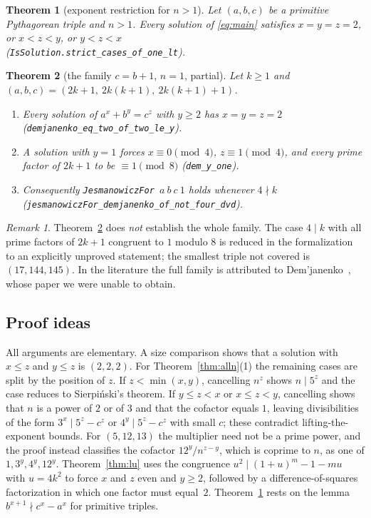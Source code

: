 \documentclass[11pt,a4paper]{article}
\newtheorem{theorem}{Theorem}
\theoremstyle{remark}
\newtheorem{remark}{Remark}
\newcommand{\lean}[1]{\texttt{#1}}
\begin{document}
\begin{theorem}[exponent restriction for $n>1$]\label{thm:red}
Let $(a,b,c)$ be a primitive Pythagorean triple and $n>1$. Every solution of
\eqref{eq:main} satisfies $x=y=z=2$, or $x<z<y$, or $y<z<x$
\\ \textup{(\lean{IsSolution.strict\_cases\_of\_one\_lt})}.
\end{theorem}

\begin{theorem}[the family $c=b+1$, $n=1$, partial]\label{thm:dem}
Let $k\ge 1$ and $(a,b,c)=(2k+1,\ 2k(k+1),\ 2k(k+1)+1)$.
\begin{enumerate}
\item Every solution of $a^x+b^y=c^z$ with $y\ge 2$ has $x=y=z=2$
\\ \textup{(\lean{demjanenko\_eq\_two\_of\_two\_le\_y})}.
\item A solution with $y=1$ forces $x\equiv 0 \pmod 4$, $z\equiv 1\pmod 4$, and
every prime factor of $2k+1$ to be $\equiv 1 \pmod 8$ \textup{(\lean{dem\_y\_one})}.
\item Consequently \lean{JesmanowiczFor}~$a\ b\ c\ 1$ holds whenever $4\nmid k$
\\ \textup{(\lean{jesmanowiczFor\_demjanenko\_of\_not\_four\_dvd})}.
\end{enumerate}
\end{theorem}

\begin{remark}
Theorem~\ref{thm:dem} does \emph{not} establish the whole family. The case
$4\mid k$ with all prime factors of $2k+1$ congruent to $1$ modulo $8$ is
reduced in the formalization to an explicitly unproved statement; the smallest
triple not covered is $(17,144,145)$. In the literature the full family is
attributed to Dem'janenko~\cite{Dem}, whose paper we were unable to obtain.
\end{remark}

\subsection*{Proof ideas}

All arguments are elementary. A size comparison shows that a solution with
$x\le z$ and $y\le z$ is $(2,2,2)$. For Theorem~\ref{thm:alln}(1) the remaining
cases are split by the position of $z$. If $z<\min(x,y)$, cancelling $n^z$
shows $n\mid 5^z$ and the case reduces to Sierpi\'nski's theorem. If
$y\le z<x$ or $x\le z<y$, cancelling shows that $n$ is a power of $2$ or of
$3$ and that the cofactor equals $1$, leaving divisibilities of the form
$3^x\mid 5^z-c^z$ or $4^y\mid 5^z-c^z$ with small $c$; these contradict
lifting-the-exponent bounds. For $(5,12,13)$ the multiplier need not be a prime
power, and the proof instead classifies the cofactor $12^y/n^{z-y}$, which is
coprime to $n$, as one of $1,3^y,4^y,12^y$. Theorem~\ref{thm:lu} uses the
congruence $u^2 \mid (1+u)^m-1-mu$ with $u=4k^2$ to force $x$ and $z$ even and
$y\ge 2$, followed by a difference-of-squares factorization in which one
factor must equal~$2$. Theorem~\ref{thm:red} rests on the lemma
$b^{x+1}\nmid c^x-a^x$ for primitive triples.
\end{document}
